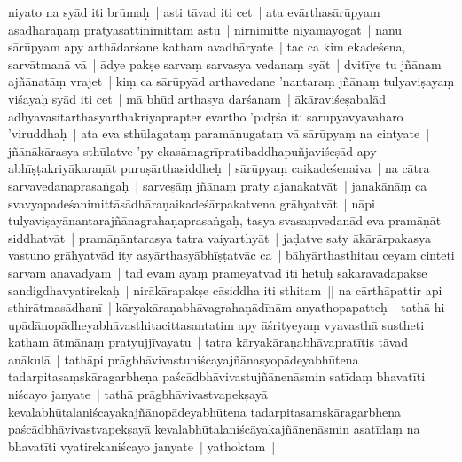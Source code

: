 \documentclass[article,a4paper]{memoir}
\begin{document}
niyato na syā\-d iti brū\-maḥ | \label{thakur75-124.33} asti tā\-vad iti cet | \label{thakur75-124.34} ata evā\-rthasā\-rū\-pyam asā\-dhā\-raṇaṃ pratyā\-sattinimittam astu | nirnimitte niyamā\-yogā\-t | \label{thakur75-125.1} nanu sā\-rū\-pyam apy arthā\-darśane katham avadhā\-ryate | tac ca kim ekadeśena, sarvā\-tmanā\- vā\- | ā\-dye pakṣe sarvaṃ sarvasya vedanaṃ syā\-t | dvitī\-ye tu jñā\-nam ajñā\-natā\-ṃ vrajet | kiṃ ca sā\-rū\-pyā\-d arthavedane 'nantaraṃ jñā\-naṃ tulyaviṣayaṃ viśayaḥ syā\-d iti cet | \label{thakur75-125.4} mā\- bhū\-d arthasya darśanam | ā\-kā\-raviśeṣabalā\-d adhyavasitā\-rthasyā\-rthakriyā\-prā\-pter evā\-rtho 'pī\-dṛśa iti sā\-rū\-pyavyavahā\-ro 'viruddhaḥ | ata eva sthū\-lagataṃ paramā\-ṇugataṃ vā\- sā\-rū\-pyaṃ na cintyate | jñā\-nā\-kā\-rasya sthū\-latve 'py ekasā\-magrī\-pratibaddhapuñjaviśeṣā\-d apy abhī\-ṣṭakriyā\-karaṇā\-t puruṣā\-rthasiddheḥ | \label{thakur75-125.7} sā\-rū\-pyaṃ caikadeśenaiva | na cā\-tra sarvavedanaprasaṅgaḥ | sarveṣā\-ṃ jñā\-naṃ praty ajanakatvā\-t | janakā\-nā\-ṃ ca svavyapadeśanimittā\-sā\-dhā\-raṇaikadeśā\-rpakatvena grā\-hyatvā\-t | \label{thakur75-125.9} nā\-pi tulyaviṣayā\-nantarajñā\-nagrahaṇaprasaṅgaḥ, tasya svasaṃvedanā\-d eva pramā\-ṇā\-t siddhatvā\-t | pramā\-ṇā\-ntarasya tatra vaiyarthyā\-t | jaḍatve saty ā\-kā\-rā\-rpakasya vastuno grā\-hyatvā\-d ity asyā\-rthasyā\-bhī\-ṣṭatvā\-c ca | bā\-hyā\-rthasthitau ceyaṃ cinteti sarvam anavadyam | \label{thakur75-125.12} tad evam ayaṃ prameyatvā\-d iti hetuḥ sā\-kā\-ravā\-dapakṣe sandigdhavyatirekaḥ | nirā\-kā\-rapakṣe cā\-siddha iti sthitam || \label{thakur75-125.14} na cā\-rthā\-pattir api sthirā\-tmasā\-dhanī\- | kā\-ryakā\-raṇabhā\-vagrahaṇā\-dī\-nā\-m anyathopapatteḥ | \label{thakur75-125.15} tathā\- hi upā\-dā\-nopā\-dheyabhā\-vasthitacittasantatim apy ā\-śrityeyaṃ vyavasthā\- sustheti katham ā\-tmā\-naṃ pratyujjī\-vayatu | tatra kā\-ryakā\-raṇabhā\-vapratī\-tis tā\-vad anā\-kulā\- | tathā\-pi prā\-gbhā\-vivastuniścayajñā\-nasyopā\-deyabhū\-tena tadarpitasaṃskā\-ragarbheṇa paścā\-dbhā\-vivastujñā\-nenā\-smin satī\-daṃ bhavatī\-ti niścayo janyate | tathā\- prā\-gbhā\-vivastvapekṣayā\- kevalabhū\-talaniścayakajñā\-nopā\-deyabhū\-tena tadarpitasaṃskā\-ragarbheṇa paścā\-dbhā\-vivastvapekṣayā\- kevalabhū\-talaniścā\-yakajñā\-nenā\-smin asatī\-daṃ na bhavatī\-ti vyatirekaniścayo janyate | yathoktam |
	\pend
      
\end{document}
